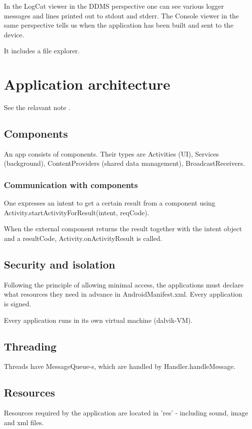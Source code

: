 \documentclass[oneside, article]{memoir}
\begin{document}
In the LogCat viewer in the DDMS perspective one can see various logger messages and lines printed out to stdout and stderr. The Console viewer in the same perspective tells us when the application has been built and sent to the device.

It includes a file explorer.

\tbc


\section{Application architecture}
See the relavant note .

\subsection{Components}
An app consists of components. Their types are Activities (UI), Services (background), ContentProviders (shared data management), BroadcastReceivers.

\subsubsection{Communication with components}
One expresses an intent to get a certain result from a component using Activity.startActivityForResult(intent, reqCode).

When the external component returns the result together with the intent object and a resultCode, Activity.onActivityResult is called.

\subsection{Security and isolation}
Following the principle of allowing minimal access, the applications must declare what resources they need in advance in AndroidManifest.xml. Every application is signed.

Every application runs in its own virtual machine (dalvik-VM).

\tbc

\subsection{Threading}
Threads have MessageQueue-s, which are handled by Handler.handleMessage.

\subsection{Resources}
Resources required by the application are located in 'res' - including sound, image and xml files.
\end{document}
